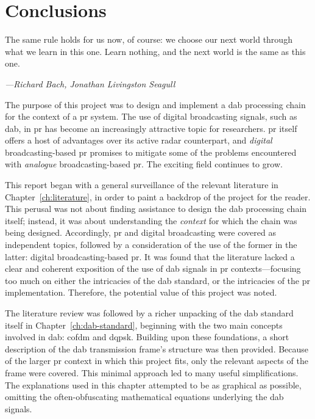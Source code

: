 \documentclass[class=report,11pt,crop=false]{standalone}
\begin{document}
\chapter{Conclusions \label{ch:conclusions}}
\epigraph{The same rule holds for us now, of course: we choose our next world through what we learn in this one. Learn nothing, and the next world is the same as this one.}%
    {\emph{---Richard Bach, Jonathan Livingston Seagull}}

The purpose of this project was to design and implement a \gls{dab} processing chain for the context of a \gls{pr} system. The use of digital broadcasting signals, such as \gls{dab}, in \gls{pr} has become an increasingly attractive topic for researchers. \gls{pr} itself offers a host of advantages over its active radar counterpart, and \emph{digital} broadcasting-based \gls{pr} promises to mitigate some of the problems encountered with \emph{analogue} broadcasting-based \gls{pr}. The exciting field continues to grow.

This report began with a general surveillance of the relevant literature in Chapter~\ref{ch:literature}, in order to paint a backdrop of the project for the reader. This perusal was not about finding assistance to design the \gls{dab} processing chain itself; instead, it was about understanding the \emph{context} for which the chain was being designed. Accordingly, \gls{pr} and digital broadcasting were covered as independent topics, followed by a consideration of the use of the former in the latter: digital broadcasting-based \gls{pr}. It was found that the literature lacked a clear and coherent exposition of the use of \gls{dab} signals in \gls{pr} contexts---focusing too much on either the intricacies of the \gls{dab} standard, or the intricacies of the \gls{pr} implementation. Therefore, the potential value of this project was noted.

The literature review was followed by a richer unpacking of the \gls{dab} standard itself in Chapter~\ref{ch:dab-standard}, beginning with the two main concepts involved in \gls{dab}: \gls{cofdm} and \gls{dqpsk}. Building upon these foundations, a short description of the \gls{dab} transmission frame's structure was then provided. Because of the larger \gls{pr} context in which this project fits, only the relevant aspects of the frame were covered. This minimal approach led to many useful simplifications. The explanations used in this chapter attempted to be as graphical as possible, omitting the often-obfuscating mathematical equations underlying the \gls{dab} signals.
\end{document}
